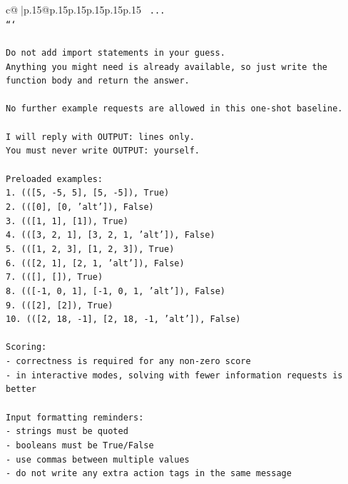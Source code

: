 \documentclass{article}
\begin{document}
{\begin{supertabular}{c@{$\;$}|p{.15\linewidth}@{}p{.15\linewidth}p{.15\linewidth}p{.15\linewidth}p{.15\linewidth}p{.15\linewidth}}
{{{\texttt{    ...} \\
\texttt{```} \\
\\ 
\texttt{Do not add import statements in your guess.} \\
\texttt{Anything you might need is already available, so just write the function body and return the answer.} \\
\\ 
\texttt{No further example requests are allowed in this one{-}shot baseline.} \\
\\ 
\texttt{I will reply with OUTPUT: lines only.} \\
\texttt{You must never write OUTPUT: yourself.} \\
\\ 
\texttt{Preloaded examples:} \\
\texttt{1. (({[}5, {-}5, 5{]}, {[}5, {-}5{]}), True)} \\
\texttt{2. (({[}0{]}, {[}0, 'alt'{]}), False)} \\
\texttt{3. (({[}1, 1{]}, {[}1{]}), True)} \\
\texttt{4. (({[}3, 2, 1{]}, {[}3, 2, 1, 'alt'{]}), False)} \\
\texttt{5. (({[}1, 2, 3{]}, {[}1, 2, 3{]}), True)} \\
\texttt{6. (({[}2, 1{]}, {[}2, 1, 'alt'{]}), False)} \\
\texttt{7. (({[}{]}, {[}{]}), True)} \\
\texttt{8. (({[}{-}1, 0, 1{]}, {[}{-}1, 0, 1, 'alt'{]}), False)} \\
\texttt{9. (({[}2{]}, {[}2{]}), True)} \\
\texttt{10. (({[}2, 18, {-}1{]}, {[}2, 18, {-}1, 'alt'{]}), False)} \\
\\ 
\texttt{Scoring:} \\
\texttt{{-} correctness is required for any non{-}zero score} \\
\texttt{{-} in interactive modes, solving with fewer information requests is better} \\
\\ 
\texttt{Input formatting reminders:} \\
\texttt{{-} strings must be quoted} \\
\texttt{{-} booleans must be True/False} \\
\texttt{{-} use commas between multiple values} \\
\texttt{{-} do not write any extra action tags in the same message} \\
}}}
\end{supertabular}}
\end{document}
